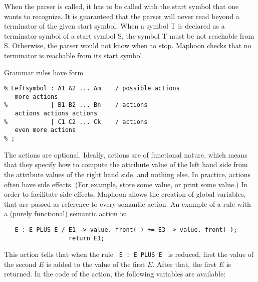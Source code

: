 \documentclass{article}
\begin{document}
\noindent
When the parser is called, it has to be called with
the start symbol that one wants to recognize. 
It is guaranteed that the parser will never read beyond
a terminator of the given start symbol. 
When a symbol T is declared as a terminator symbol of a start
symbol S, the symbol T must be not reachable from S. 
Otherwise, the parser would not know when to stop.
Maphoon checks that no terminator is reachable from its
start symbol. 

\noindent
Grammar rules have form
\begin{verbatim}
% Leftsymbol : A1 A2 ... Am    / possible actions
   more actions 
%            | B1 B2 ... Bn    / actions
   actions actions actions
%            | C1 C2 ... Ck    / actions
   even more actions 
% ;

\end{verbatim}


\noindent
The actions are optional. 
Ideally, actions are of functional nature, which means
that they specify how to compute the attribute value of the left hand side 
from the attribute values of the right hand side,
and nothing else. 
In practice, actions often have side effects.
(For example, store some value, or print some value.)
In order to facilitate side effects, Maphoon allows the creation
of global variables, that are passed as reference to
every semantic action. 
An example of a rule with a (purely functional) semantic action is:
\begin{verbatim}
   E : E PLUS E / E1 -> value. front( ) += E3 -> value. front( ); 
                  return E1;
\end{verbatim}
This action tells that when the rule 
\verb+ E : E PLUS E + is reduced, first the value of the second $ E $
is added to the value of the first $ E. $ After that, 
the first $ E $ is returned.
In the code of the action, the following variables are available:
\end{document}
